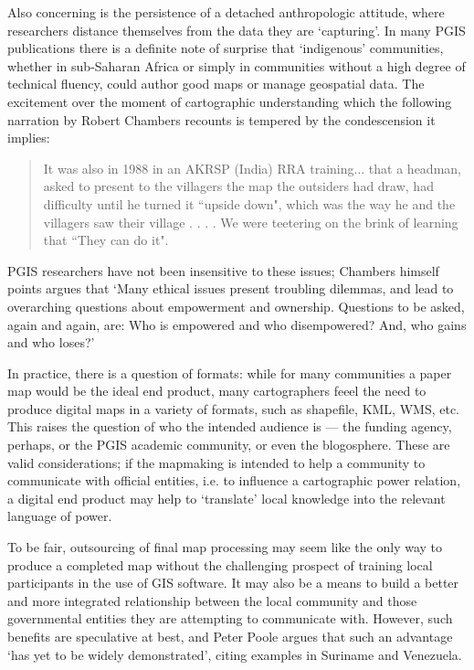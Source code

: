 \documentclass[11pt,oneside,notitlepage]{report}
\begin{document}
{{Also concerning is the persistence of a detached anthropologic attitude, where researchers distance themselves from the data they are `capturing'. In many \ac{PGIS} publications there is a definite note of surprise that `indigenous' communities, whether in sub-Saharan Africa or simply in communities without a high degree of technical fluency, could author good maps or manage geospatial data. The excitement over the moment of cartographic understanding which the following narration by Robert Chambers recounts is tempered by the condescension it implies: 

\begin{quote}
It was also in 1988 in an AKRSP (India) RRA training... that a headman, asked to present to the villagers the map the outsiders had draw, had difficulty until he turned it ``upside down", which was the way he and the villagers saw their village . . . . We were teetering on the brink of learning that ``They can do it".
\cite{chambers2006participatory}
\end{quote}

\ac{PGIS} researchers have not been insensitive to these issues; Chambers himself points argues that `Many ethical issues present troubling dilemmas, and lead to overarching questions about empowerment and ownership. Questions to be asked, again and again, are: Who is empowered and who disempowered? And, who gains and who loses?' \cite{chambers2006whose}

In practice, there is a question of formats: while for many communities a paper map would be the ideal end product, many cartographers feeel the need to produce digital maps in a variety of formats, such as shapefile, \ac{KML}, \ac{WMS}, etc. This raises the question of who the intended audience is --- the funding agency, perhaps, or the \ac{PGIS} academic community, or even the blogosphere. These are valid considerations; if the mapmaking is intended to help a community to communicate with official entities, i.e. to influence a cartographic power relation, a digital end product may help to `translate' local knowledge into the relevant language of power. 

To be fair, outsourcing of final map processing may seem like the only way to produce a completed map without the challenging prospect of training local participants in the use of GIS software. It may also be a means to build a better and more integrated relationship between the local community and those governmental entities they are attempting to communicate with. However, such benefits are speculative at best, and Peter Poole argues that such an advantage `has yet to be widely demonstrated', citing examples in Suriname and Venezuela. \cite{poole2006there}

}}
\end{document}
